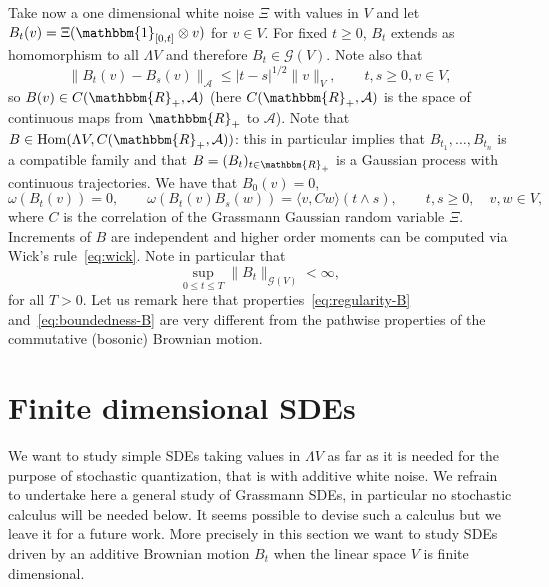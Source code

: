 \documentclass[11pt]{article}
\newcommand{\tmop}[1]{\ensuremath{\operatorname{#1}}}
\begin{document}
Take now a one dimensional white noise $\Xi$ with values in $V$ and let $B_t
(v) = \Xi (\mathbbm{1}_{[0, t]} \otimes v)$ for $v \in V$. For fixed $t
\geqslant 0$, $B_t$ extends as homomorphism to all $\Lambda V$ and therefore
$B_t \in \mathcal{G} (V)$. Note also that
\begin{equation}
  \| B_t (v) - B_s (v) \|_{\mathcal{A}} \leqslant | t - s |^{1 / 2} \| v \|_V,
  \qquad t, s \geqslant 0, v \in V, \label{eq:regularity-B}
\end{equation}
so $B (v) \in C (\mathbbm{R}_+, \mathcal{A})$ (here $C (\mathbbm{R}_+,
\mathcal{A})$ is the space of continuous maps from $\mathbbm{R}_+$ to
$\mathcal{A}$). Note that $B \in \tmop{Hom} (\Lambda V, C (\mathbbm{R}_+,
\mathcal{A}))$: this in particular implies that $B_{t_1}, \ldots, B_{t_n}$ is
a compatible family and that $B = (B_t)_{t \in \mathbbm{R}_+}$ is a Gaussian
process with continuous trajectories. We have that $B_0 (v) = 0$,
\[ \omega (B_t (v)) = 0, \qquad \omega (B_t (v) B_s (w)) = \langle v, C w
   \rangle  (t \wedge s), \qquad t, s \geqslant 0, \quad v, w \in V, \]
where $C$ is the correlation of the Grassmann Gaussian random variable $\Xi$.
Increments of $B$ are independent and higher order moments can be computed via
Wick's rule~{\eqref{eq:wick}}. Note in particular that
\begin{equation}
  \sup_{0 \leqslant t \leqslant T} \| B_t \|_{\mathcal{G} (V)} < \infty,
  \label{eq:boundedness-B}
\end{equation}
for all $T > 0$. Let us remark here that properties~{\eqref{eq:regularity-B}}
and~{\eqref{eq:boundedness-B}} are very different from the pathwise properties
of the commutative (bosonic) Brownian motion.

\section{Finite dimensional SDEs}\label{sec:finite-dim}

We want to study simple SDEs taking values in $\Lambda V$ as far as it is
needed for the purpose of stochastic quantization, that is with additive white
noise. We refrain to undertake here a general study of Grassmann SDEs, in
particular no stochastic calculus will be needed below. It seems possible to
devise such a calculus but we leave it for a future work. More precisely in
this section we want to study SDEs driven by an additive Brownian motion $B_t$
when the linear space $V$ is finite dimensional.
\end{document}
